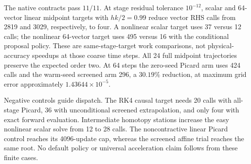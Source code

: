 The native contracts pass $11/11$. At stage residual tolerance $10^{-12}$,
scalar and 64-vector linear midpoint targets with $hk/2=0.99$ reduce vector
RHS calls from 2819 and 3029, respectively, to four. A nonlinear scalar target
uses 37 versus 12 calls; the nonlinear 64-vector target uses 495 versus 16
with the conditional proposal policy. These are same-stage-target work
comparisons, not physical-accuracy speedups at those coarse time steps.
All 24 full midpoint trajectories preserve the expected order two. At 64
steps the zero-seed Picard arm uses 424 calls and the warm-seed screened arm
296, a $30.19\%$ reduction, at maximum grid error approximately
$1.43644\times10^{-5}$.

Negative controls guide dispatch. The RK4 causal target needs 20 calls with
all-stage Picard, 36 with unconditional screened extrapolation, and only four
with exact forward evaluation. Intermediate homotopy stations increase the
easy nonlinear scalar solve from 12 to 28 calls. The noncontractive linear
Picard control reaches its 4096-update cap, whereas the screened affine
trial reaches the same root. No default policy or universal acceleration
claim follows from these finite cases.
